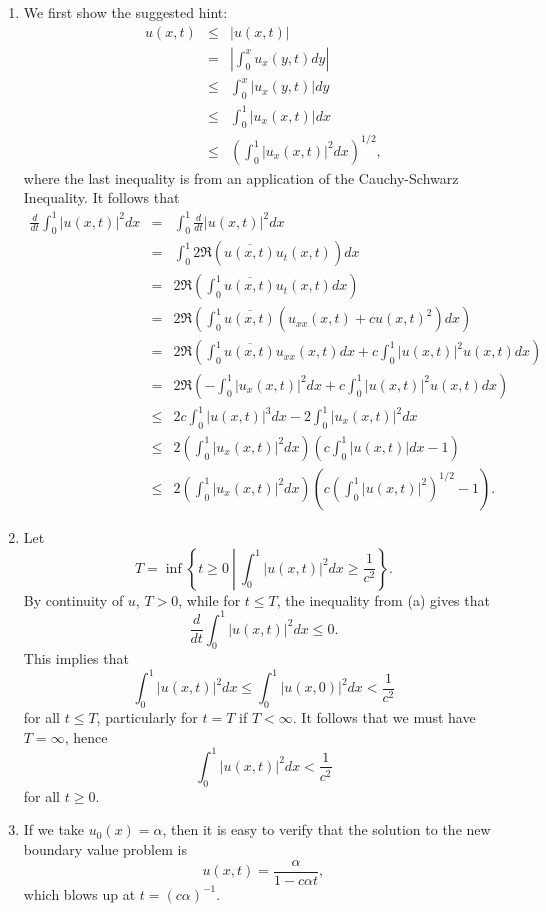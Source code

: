 \documentclass{article}
\begin{document}
\begin{enumerate}
\begin{enumerate}
\item We first show the suggested hint:
\begin{eqnarray*}
u(x,t) & \leq & |u(x,t)| \\
       &   =  & \left| \int_0^x u_x(y,t) dy \right| \\
       & \leq & \int_0^x |u_x(y,t)| dy \\
       & \leq & \int_0^1 |u_x(x,t)| dx \\
       & \leq & \left( \int_0^1 |u_x(x,t)|^2 dx \right)^{1/2},
\end{eqnarray*}
where the last inequality is from an application of the Cauchy-Schwarz Inequality.  It follows that
\begin{eqnarray*}
\frac{d}{dt} \int_0^1 |u(x,t)|^2 dx
&   =  & \int_0^1 \frac{d}{dt} |u(x,t)|^2 dx \\
&   =  & \int_0^1 2 \Re \left( \overline{u(x,t)} u_t(x,t) \right) dx \\
&   =  & 2 \Re \left( \int_0^1 \overline{u(x,t)} u_t(x,t) dx \right) \\
&   =  & 2 \Re \left( \int_0^1 \overline{u(x,t)} \left( u_{xx}(x,t) + c u(x,t)^2 \right) dx \right) \\
&   =  & 2 \Re \left( \int_0^1 \overline{u(x,t)} u_{xx}(x,t) dx + c \int_0^1 |u(x,t)|^2 u(x,t) dx \right) \\
&   =  & 2 \Re \left( -\int_0^1 |u_x(x,t)|^2 dx + c \int_0^1 |u(x,t)|^2 u(x,t) dx \right) \\
& \leq & 2 c \int_0^1 |u(x,t)|^3 dx - 2 \int_0^1 |u_x(x,t)|^2 dx \\
& \leq & 2 \left( \int_0^1 |u_x(x,t)|^2 dx \right) \left( c \int_0^1 |u(x,t)| dx - 1 \right) \\
& \leq & 2 \left( \int_0^1 |u_x(x,t)|^2 dx \right) \left( c \left( \int_0^1 |u(x,t)|^2 \right)^{1/2} - 1 \right).
\end{eqnarray*}

\item Let
\[T = \inf \left\{ t \geq 0 \ \left| \ \int_0^1 |u(x,t)|^2 dx \geq \frac{1}{c^2} \right. \right\}.\]
By continuity of \(u\), \(T > 0\), while for \(t \leq T\), the inequality from (a) gives that
\[\frac{d}{dt} \int_0^1 |u(x,t)|^2 dx \leq 0.\]
This implies that
\[\int_0^1 |u(x,t)|^2 dx \leq \int_0^1 |u(x,0)|^2 dx < \frac{1}{c^2}\]
for all \(t \leq T\), particularly for \(t = T\) if \(T < \infty\).  It follows that we must have \(T = \infty\), hence
\[\int_0^1 |u(x,t)|^2 dx < \frac{1}{c^2}\]
for all \(t \geq 0\).

\item If we take \(u_0(x) = \alpha\), then it is easy to verify that the solution to the new boundary value problem is
\[u(x,t) = \frac{\alpha}{1 - c \alpha t},\]
which blows up at \(t = (c \alpha)^{-1}\).

\end{enumerate}




\end{enumerate}
\end{document}
